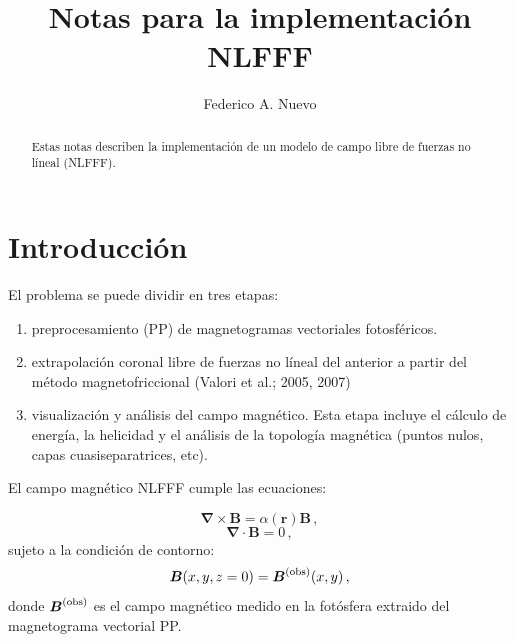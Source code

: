 \documentclass[a4paper,10pt]{article}
\title{Notas para la implementación NLFFF}
\author{Federico A. Nuevo}
\def\bB{{\boldsymbol{B}}}
\def\br{{\boldsymbol{r}}}
\def\rot{\boldsymbol{\nabla \times}}
\def\div{\boldsymbol{\nabla \cdot}}
\def\bBobs{{\boldsymbol{B}}^{\rm (obs)}}
\begin{document}
\maketitle

\begin{abstract}
Estas notas describen la implementación de un modelo de campo libre de fuerzas no líneal (NLFFF). 
\end{abstract}

\section{Introducción}

El problema se puede dividir en tres etapas:
\begin{enumerate}
 \item preprocesamiento (PP) de magnetogramas vectoriales fotosféricos.
 \item extrapolación coronal libre de fuerzas no líneal del anterior a partir del método magnetofriccional (Valori et al.; 2005, 2007)
 \item visualización y análisis del campo magnético. Esta etapa incluye el cálculo de energía, la helicidad y el análisis de la topología magnética (puntos nulos, capas cuasiseparatrices, etc).
\end{enumerate}

El campo magnético NLFFF cumple las ecuaciones:

\begin{equation}
 \rot \bB = \alpha (\br) \bB \,, \label{nlff}
\end{equation}
\begin{equation}
 \div \bB = 0 \label{div0} \,,
\end{equation}
sujeto a la condición de contorno:
\begin{equation}
\bB(x,y,z=0) = \bBobs(x,y) \label{ccfot} \,,
\end{equation}
donde $\bBobs$ es el campo magnético medido en la fotósfera extraido del magnetograma vectorial PP.
\end{document}
